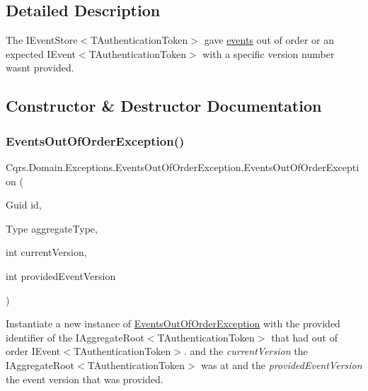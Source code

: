 \subsection{Detailed Description}
The I\+Event\+Store$<$\+T\+Authentication\+Token$>$ gave \hyperlink{}{events} out of order or an expected I\+Event$<$\+T\+Authentication\+Token$>$ with a specific version number wasn\textquotesingle{}t provided. 



\subsection{Constructor \& Destructor Documentation}
\mbox{\label{classCqrs_1_1Domain_1_1Exceptions_1_1EventsOutOfOrderException_aebc1013f20fc9a5fb4644e85cf5241b0_aebc1013f20fc9a5fb4644e85cf5241b0}} 
\subsubsection{\texorpdfstring{Events\+Out\+Of\+Order\+Exception()}{EventsOutOfOrderException()}}
{\footnotesize\ttfamily Cqrs.\+Domain.\+Exceptions.\+Events\+Out\+Of\+Order\+Exception.\+Events\+Out\+Of\+Order\+Exception (\begin{DoxyParamCaption}\item[{Guid}]{id,  }\item[{Type}]{aggregate\+Type,  }\item[{int}]{current\+Version,  }\item[{int}]{provided\+Event\+Version }\end{DoxyParamCaption})}



Instantiate a new instance of \hyperlink{classCqrs_1_1Domain_1_1Exceptions_1_1EventsOutOfOrderException}{Events\+Out\+Of\+Order\+Exception} with the provided identifier of the I\+Aggregate\+Root$<$\+T\+Authentication\+Token$>$ that had out of order I\+Event$<$\+T\+Authentication\+Token$>$. and the {\itshape current\+Version}  the I\+Aggregate\+Root$<$\+T\+Authentication\+Token$>$ was at and the {\itshape provided\+Event\+Version} the event version that was provided. 


